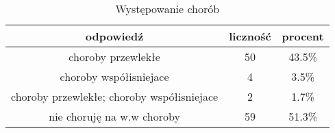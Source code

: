 \begin{table}[H]
\caption{Występowanie chorób}
\centering
\begin{tabular}{ | c | c | c |}
\hline
odpowiedź & liczność & procent\\
\hline
choroby przewlekłe  &  50  & 43.5\% \\
\hline
choroby współisniejace  &  4  & 3.5\% \\
\hline
choroby przewlekłe; choroby współisniejace  &  2  & 1.7\% \\
\hline
nie choruję na w.w choroby  &  59  & 51.3\% \\
\hline
\end{tabular}
\label{tab:Q33}
\end{table}
